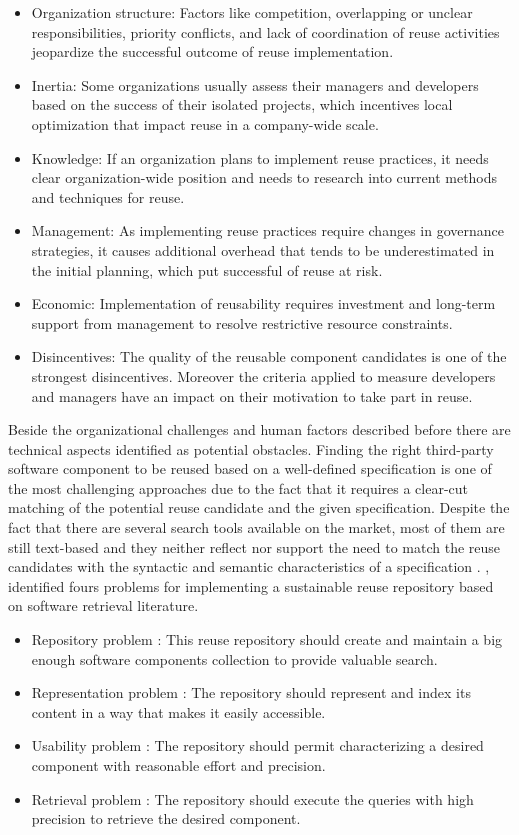 \begin{itemize}
\item Organization structure: Factors like competition, overlapping or unclear responsibilities, priority conflicts, and lack of coordination of reuse activities jeopardize the successful outcome of reuse implementation. 
\item Inertia: Some organizations usually assess their managers and developers based on the success of their isolated projects, which incentives local optimization that impact reuse in a company-wide scale. 
\item Knowledge: If an organization plans to implement reuse practices, it needs clear organization-wide position and needs to research into current methods and techniques for reuse.
\item Management: As implementing reuse practices require changes in governance strategies, it causes additional overhead that tends to be underestimated in the initial planning, which put successful of reuse at risk.
\item Economic: Implementation of reusability requires investment and long-term support from management to resolve restrictive resource constraints.
\item Disincentives: The quality of the reusable component candidates is one of the strongest disincentives. Moreover the criteria applied to measure developers and managers have an impact on their motivation to take part in reuse.
\end{itemize}

Beside the organizational challenges and human factors described before there are technical aspects identified as potential obstacles. Finding the right third-party software component to be reused based on a well-defined specification is one of the most challenging approaches due to the fact that it requires a clear-cut matching of the potential reuse candidate and the given specification. Despite the fact that there are several search tools available on the market, most of them are still text-based and they neither reflect nor support the need to match the reuse candidates with the syntactic and semantic characteristics of a specification \cite{Hummel2013}. \citet{Hummel2013}, identified fours problems for implementing a sustainable reuse repository based on software retrieval literature.

\begin{itemize}
\item Repository problem \cite{Seacord1999}: This reuse repository should create and maintain a big enough software components collection to provide valuable search.
\item Representation problem \cite{Pole1994}: The repository should represent and index its content in a way that makes it easily accessible.
\item Usability problem \cite{Garcia2006}: The repository should permit characterizing a desired component with reasonable effort and precision.
\item Retrieval problem \cite{Prieto-Diaz1987}: The repository should execute the queries with high precision to retrieve the desired component.
\end{itemize}

